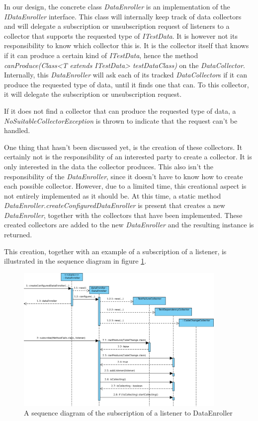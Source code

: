 \documentclass[i2]{oss}
\newcommand{\class}[1]{\emph{#1}}
\newcommand{\method}[1]{\emph{#1}}
\begin{document}
In our design, the concrete class \class{DataEnroller} is an implementation of the \class{IDataEnroller} interface.
This class will internally keep track of data collectors and will delegate a subscription or unsubscription request of listeners to a collector that supports the requested type of \class{ITestData}.
It is however not its responsibility to know which collector this is.
It is the collector itself that knows if it can produce a certain kind of \class{ITestData}, hence the method \method{canProduce(Class<T extends ITestData> testDataClass)} on the \class{DataCollector}.
Internally, this \class{DataEnroller} will ask each of its tracked \class{DataCollector}s if it can produce the requested type of data, until it finds one that can.
To this collector, it will delegate the subscription or unsubscription request.

If it does not find a collector that can produce the requested type of data, a \class{NoSuitableCollectorException} is thrown to indicate that the request can't be handled.

One thing that hasn't been discussed yet, is the creation of these collectors.
It certainly not is the responsibility of an interested party to create a collector. 
It is only interested in the data the collector produces.
This also isn't the responsibility of the \class{DataEnroller}, since it doesn't have to know how to create each possible collector.
However, due to a limited time, this creational aspect is not entirely implemented as it should be.
At this time, a static method \method{DataEnroller.createConfiguredDataEnroller} is present that creates a new \class{DataEnroller}, together with the collectors that have been implemented.
These created collectors are added to the new \class{DataEnroller} and the resulting instance is returned.

This creation, together with an example of a subscription of a listener, is illustrated in the sequence diagram in figure \ref{fig:sequence:subscribe-collector-listener}.

\begin{figure}[tbp]
\begin{center}
    \includegraphics[width=0.9\textwidth]{SubscribeToDataCollector}
    \caption{A sequence diagram of the subscription of a listener to DataEnroller}
	\label{fig:sequence:subscribe-collector-listener}
\end{center}
\end{figure}
\end{document}
